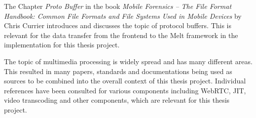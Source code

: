 \documentclass[../MasterThesis.tex]{subfiles}
\begin{document}
\begin{description}[font=\color{RedViolet!80!black}, style=nextline]
		
		
	
		
		
		\item[Protocol buffer] 
		
		The Chapter \textit{Proto Buffer} in the book \textit{Mobile Forensics -- The File Format Handbook: Common File Formats and File Systems Used in Mobile Devices} by Chris Currier introduces and discusses the topic of protocol buffers. This is relevant for the data transfer from the frontend to the Melt framework in the implementation for this thesis project.~\cite{protobuffer}
		
		
		
	
		\newpage
		
		\item[Multimedia processing] 
		
		The topic of multimedia processing is widely spread and has many different areas. This resulted in many papers, standards and documentations being used as sources to be combined into the overall context of this thesis project. Individual references have been consulted for various components including WebRTC, JIT, video transcoding and other components, which are relevant for this thesis project.
		
		
		
		
		
		

		
		
		
		
		
	\end{description}
	
	
	
	
	
	
	
	
	
\end{document}
